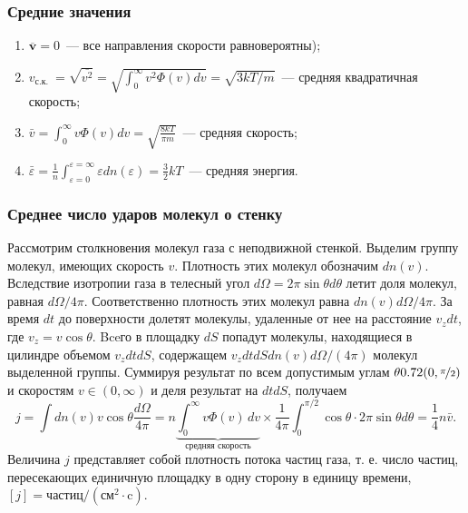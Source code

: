 \subsubsection{Средние значения}
\begin{enumerate}
	\item $\overline{\mathbf{v}}=0$~--- все направления скорости равновероятны);
	\item $v_{\text {с.к. }}=\sqrt{\overline{v^2}}=\sqrt{\int_0^{\infty} v^2 \Phi(v) d v}=\sqrt{3 k T / m}$~--- средняя квадратичная скорость;
	\item $\bar{v}=\int_0^{\infty} v \Phi(v) d v=\sqrt{\frac{8 k T}{\pi m}}$~--- средняя скорость;
	\item $\bar{\varepsilon}=\frac{1}{n} \int_{\varepsilon=0}^{\varepsilon=\infty} \varepsilon d n(\varepsilon)=\frac{3}{2} k T$~--- средняя энергия.
\end{enumerate}

\subsubsection*{Среднее число ударов молекул о стенку}
Рассмотрим столкновения молекул газа с неподвижной стенкой. Выделим группу молекул, имеющих скорость $v$. Плотность этих молекул обозначим $d n(v)$. Вследствие изотропии газа в телесный угол $d \Omega=2 \pi \sin \theta d \theta$ летит доля молекул, равная $d \Omega / 4 \pi$. Соответственно плотность этих молекул равна $dn(v) d \Omega / 4 \pi$. За время $dt$ до поверхности долетят молекулы, удаленные от нее на расстояние $v_z d t$, где $v_z=v \cos \theta$. Bceго в площадку $d S$ попадут молекулы, находящиеся в цилиндре объемом $v_z d t d S$, содержащем $v_z d t d S d n(v) d \Omega /(4 \pi)$ молекул выделенной группы. Суммируя результат по всем допустимым углам $\theta \in (0, \nicefrac{\pi}{2})$ и скоростям $v \in (0, \infty)$ и деля результат на $d t d S$, получаем
\begin{equation}
j=\int d n(v) v \cos \theta \frac{d \Omega}{4 \pi}=n \underbrace{\int_0^{\infty} v \Phi(v) \, d v}_{\text{средняя скорость}} \times \frac{1}{4 \pi} \int_0^{\pi / 2} \cos \theta \cdot 2 \pi \sin \theta d \theta=\frac{1}{4} n \bar{v} .
\label{eq:mean-count-mxwl}
\end{equation}
Величина $j$ представляет собой плотность потока частиц газа, т. е. число частиц, пересекающих единичную площадку в одну сторону в единицу времени, $[j]= \text{частиц}/\left(\text{см}^2 \cdot \text{c}\right)$.

